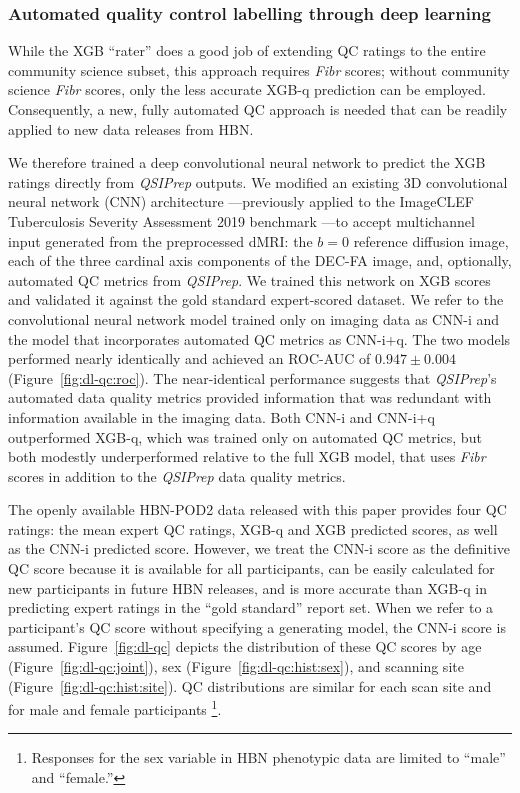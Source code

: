 \documentclass[9pt,lineno]{elife}
\begin{document}
\subsubsection{Automated quality control labelling through deep learning}

While the XGB ``rater'' does a good job of extending QC ratings to the entire
community science subset, this approach requires \emph{Fibr} scores; without community
science \emph{Fibr} scores, only the less accurate XGB-q
prediction can be employed. Consequently, a new, fully automated QC approach is needed that can be readily applied to new data releases from HBN.

We therefore trained a deep convolutional neural network to predict the XGB
ratings directly from \emph{QSIPrep} outputs. We modified an existing 3D
convolutional neural network (CNN) architecture \citep{zunair2020-bs}---previously
applied to the ImageCLEF Tuberculosis Severity Assessment 2019 benchmark
\citep{dicente2019clef}---to accept multichannel input generated from the
preprocessed dMRI: the $b=0$ reference diffusion image, each of the three
cardinal axis components of the DEC-FA image, and, optionally, automated QC
metrics from \emph{QSIPrep}. We trained this network on XGB scores and validated it
against the gold standard expert-scored dataset. We refer to the convolutional
neural network model trained only on imaging data as CNN-i and the model that
incorporates automated QC metrics as CNN-i+q. The two models performed nearly
identically and achieved an ROC-AUC of $0.947 \pm 0.004$ (Figure~\ref{fig:dl-qc:roc}). The
near-identical performance suggests that \emph{QSIPrep}'s automated data quality metrics
provided information that was redundant with information available in the imaging
data. Both CNN-i and CNN-i+q outperformed XGB-q, which was trained only on
automated QC metrics, but both modestly underperformed relative to the full XGB model,
that uses \emph{Fibr} scores in addition to the \emph{QSIPrep} data quality metrics.

The openly available HBN-POD2 data released with this paper provides four QC ratings: the mean expert QC ratings, XGB-q and
XGB predicted scores, as well as the CNN-i predicted score. However, we treat the CNN-i
score as the definitive QC score because it is available for all participants,
can be easily calculated for new participants in future HBN releases, and is more
accurate than XGB-q in predicting expert ratings in the ``gold standard'' report set. When we refer to a participant's QC score without
specifying a generating model, the CNN-i score is assumed.
Figure~\ref{fig:dl-qc} depicts the distribution of these QC scores by age
(Figure~\ref{fig:dl-qc:joint}), sex (Figure~\ref{fig:dl-qc:hist:sex}), and scanning site
(Figure~\ref{fig:dl-qc:hist:site}). QC distributions are similar for each scan site
and for male and female participants \footnote{%
    Responses for the sex variable in HBN phenotypic data are limited to
    ``male'' and ``female.''
}.
\end{document}
